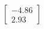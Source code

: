 \documentclass[preview]{standalone}
\begin{document}
\begin{align*}
\begin{bmatrix} -4.86 \\ 2.93 \end{bmatrix}
\end{align*}
\end{document}
